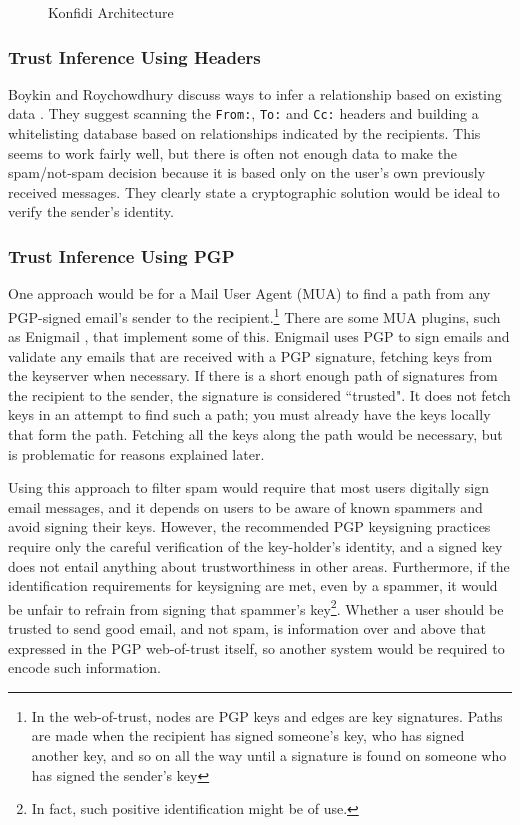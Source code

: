 \documentclass[letterpaper]{www2006-submission}
\begin{document}
\begin{figure*}[htp]
\centering
{}
\caption{Konfidi Architecture}
\label{fig:arch}
\end{figure*}

\subsubsection{Trust Inference Using Headers}
Boykin and Roychowdhury discuss ways to infer a relationship based on existing data \citep{boykin04email}.  They suggest scanning the \texttt{From:}, \texttt{To:} and \texttt{Cc:} headers and building a whitelisting database based on relationships indicated by the recipients.  This seems to work fairly well, but there is often not enough data to make the spam/not-spam decision because it is based only on the user's own previously received messages. They clearly state a cryptographic solution would be ideal to verify the sender's identity.

\subsubsection{Trust Inference Using PGP}
\label{earlierPGP}
One approach would be for a Mail User Agent (MUA) to find a path from any PGP-signed email's sender to the recipient.\footnote{In the web-of-trust, nodes are PGP keys and edges are key signatures.  Paths are made when the recipient has signed someone's key, who has signed another key, and so on all the way until a signature is found on someone who has signed the sender's key}  There are some MUA plugins, such as Enigmail \citep{enigmail}, that implement some of this.  Enigmail uses PGP to sign emails and validate any emails that are received with a PGP signature, fetching keys from the keyserver when necessary.  If there is a short enough path of signatures from the recipient to the sender, the signature is considered ``trusted".  It does not fetch keys in an attempt to find such a path; you must already have the keys locally that form the path.  Fetching all the keys along the path would be necessary, but is problematic for reasons explained later.

Using this approach to filter spam would require that most users digitally sign email messages, and it depends on users to be aware of known spammers and avoid signing their keys. However, the recommended PGP keysigning practices require only the careful verification of the key-holder's identity, and a signed key does not entail anything about trustworthiness in other areas.  Furthermore, if the identification requirements for keysigning are met, even by a spammer, it would be unfair to refrain from signing that spammer's key\footnote{In fact, such positive identification might be of use.}.  Whether a user should be trusted to send good email, and not spam, is information over and above that expressed in the PGP web-of-trust itself, so another system would be required to encode such information.
\end{document}
